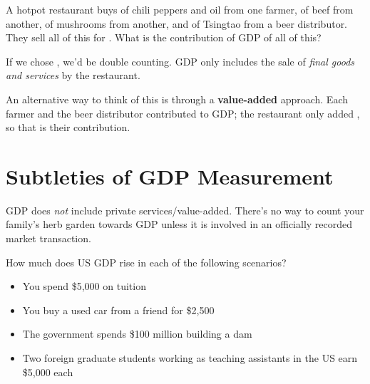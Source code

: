 \documentclass{article}
\begin{document}
A hotpot restaurant buys  of chili peppers and oil from one farmer,  of beef from another,  of mushrooms from another, and  of Tsingtao from a beer distributor. They sell all of this for . What is the contribution of GDP of all of this?

If we chose , we'd be double counting. GDP only includes the  sale of \textit{final goods and services} by the restaurant.

An alternative way to think of this is through a \textbf{value-added} approach. Each farmer and the beer distributor contributed  to GDP; the restaurant only added , so that is their contribution.

\section*{Subtleties of GDP Measurement}

GDP does \textit{not} include private services/value-added. There's no way to count your family's herb garden towards GDP unless it is involved in an officially recorded market transaction.

How much does US GDP rise in each of the following scenarios?

\begin{itemize}
\item You spend \$5,000 on tuition
\item You buy a used car from a friend for \$2,500
\item The government spends \$100 million building a dam
\item Two foreign graduate students working as teaching assistants in the US earn \$5,000 each
\end{itemize}
\end{document}
